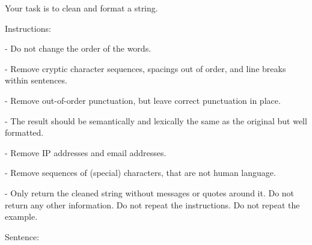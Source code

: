 Your task is to clean and format a string.

Instructions:

- Do not change the order of the words.

- Remove cryptic character sequences, spacings out of order, and line breaks within sentences.

- Remove out-of-order punctuation, but leave correct punctuation in place. 

- The result should be semantically and lexically the same as the original but well formatted.

- Remove IP addresses and email addresses.

- Remove sequences of (special) characters, that are not human language.

- Only return the cleaned string without messages or quotes around it. Do not return any other information. Do not repeat the instructions. Do not repeat the example.

\bigskip

Sentence:

\smallskip